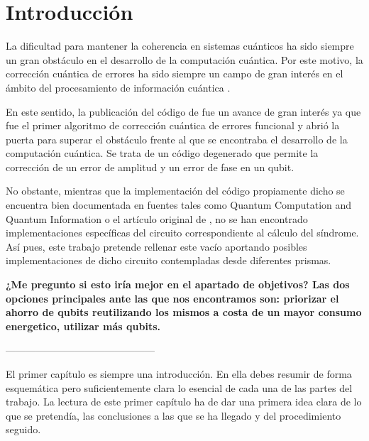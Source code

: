 \chapter{Introducción}

La dificultad para mantener la coherencia en sistemas cuánticos ha sido siempre un gran obstáculo en el desarrollo de
la computación cuántica. Por este motivo, la corrección cuántica de errores ha sido siempre un campo de gran interés
en el ámbito del procesamiento de información cuántica \citep{qecb}.

En este sentido, la publicación del código de \cite{shor95} fue un avance de gran interés ya que fue el primer
algoritmo de corrección cuántica de errores funcional y abrió la puerta para superar el obstáculo frente al que se encontraba el desarrollo de la computación cuántica. Se trata de un código degenerado que permite la corrección de un error de amplitud y un error de fase en un qubit.

No obstante, mientras que la implementación del código propiamente dicho se encuentra bien documentada en fuentes
tales como Quantum Computation and Quantum Information \citep{nielsenchuang} o el artículo original de \cite{shor95}, no se han encontrado implementaciones específicas del circuito correspondiente al cálculo del síndrome. Así pues, este trabajo pretende rellenar este vacío aportando posibles implementaciones de dicho circuito contempladas desde diferentes prismas.

\textbf{¿Me pregunto si esto iría mejor en el apartado de objetivos? Las dos opciones principales ante las que nos encontramos son: priorizar el ahorro de qubits reutilizando los mismos a costa de un mayor consumo energetico, utilizar más qubits.}

















---------------------------------------------

El primer capítulo es siempre una introducción. En ella debes resumir de forma esquemática pero suficientemente clara lo esencial de cada una de las partes del trabajo. La lectura de este primer capítulo ha de dar una primera idea clara de lo que se pretendía, las conclusiones a las que se ha llegado y del procedimiento seguido.


